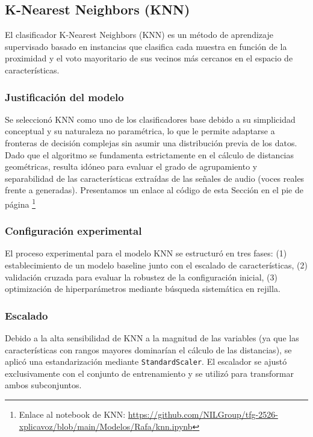 \subsection{K-Nearest Neighbors (KNN)}
\label{subsubsec:mod_knn}

El clasificador K-Nearest Neighbors (KNN) es un método de aprendizaje supervisado basado en instancias que clasifica cada muestra en función de la proximidad y el voto mayoritario de sus vecinos más cercanos en el espacio de características.

\subsubsection*{Justificación del modelo}

Se seleccionó KNN como uno de los clasificadores base debido a su simplicidad conceptual y su naturaleza no paramétrica, lo que le permite adaptarse a fronteras de decisión complejas sin asumir una distribución previa de los datos. Dado que el algoritmo se fundamenta estrictamente en el cálculo de distancias geométricas, resulta idóneo para evaluar el grado de agrupamiento y separabilidad de las características extraídas de las señales de audio (voces reales frente a generadas). Presentamos un enlace al código de esta Sección en el pie de página \footnote{Enlace al notebook de KNN: \url{https://github.com/NILGroup/tfg-2526-xplicavoz/blob/main/Modelos/Rafa/knn.ipynb}}

\subsubsection*{Configuración experimental}

El proceso experimental para el modelo KNN se estructuró en tres fases: (1) establecimiento de un modelo baseline junto con el escalado de características, (2) validación cruzada para evaluar la robustez de la configuración inicial, (3) optimización de hiperparámetros mediante búsqueda sistemática en rejilla.

\subsubsection*{Escalado}

Debido a la alta sensibilidad de KNN a la magnitud de las variables (ya que las características con rangos mayores dominarían el cálculo de las distancias), se aplicó una estandarización mediante \texttt{StandardScaler}. El escalador se ajustó exclusivamente con el conjunto de entrenamiento y se utilizó para transformar ambos subconjuntos.

